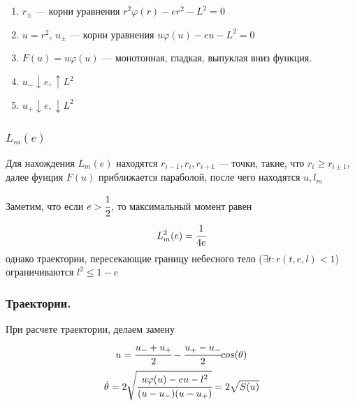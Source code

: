 \documentclass[a4paper, 14pt]{article}
\begin{document}
\begin{enumerate}
		\item $r_{\pm}$ --- корни уравнения $r^2\varphi(r)-er^2-L^2=0$
		\item $u = r^2$, $u_{\pm}$ --- корни уравнения  $u\varphi(u)-eu-L^2=0$
		\item $F(u) = u\varphi(u)$ --- монотонная, гладкая, выпуклая вниз функция.
		\item $u_{-} \downarrow e, \uparrow L^2$
		\item $u_{+} \downarrow e, \downarrow L^2$
	\end{enumerate}
	
	
	\subsubsection{$L_m(e)$}
	Для нахождения $L_m(e)$ находятся $r_{i-1},r_i, r_{i+1}$ --- точки, такие, что $r_i \ge r_{i\pm1}$, далее фунция $F(u)$ приближается параболой, после чего находятся $u, l_m$
	
	Заметим, что если $e>\cfrac{1}{2}$, то максимальный момент равен
	\begin{equation*}
		L^2_m(e) = \cfrac{1}{4e}
	\end{equation*}
	однако траектории, пересекающие границу небесного тело ($\exists t: r(t,e,l) < 1$) ограничиваются $l^2 \le 1 - e$
	
	
	
	
	\subsubsection{Траектории.}
	При расчете траектории, делаем замену
	\begin{equation}
		u = \cfrac{u_{-}+u_{+}}{2} - \cfrac{u_{+}-u_{-}}{2}cos(\theta)
		\label{eq:tr_in_func}
	\end{equation}
	\begin{equation*}
		\dot{\theta} = 2\sqrt{ \cfrac{u\varphi(u)-eu-l^2}{(u-u_{-})(u-u_{+})} } = 2\sqrt{S(u)}
	\end{equation*}
	
\end{document}

